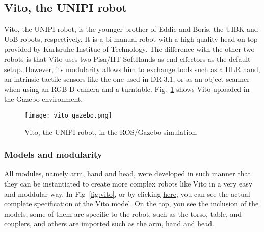 \subsection{Vito, the UNIPI robot}
\label{sec:vito}

Vito, the UNIPI robot, is the younger brother of Eddie and Boris, the UIBK and UoB robots, respectively. It is a bi-manual robot with a high quality head on top provided by Karlsruhe Institue of Technology. The difference with the other two robots is that Vito uses two Pisa/IIT SoftHands as end-effectors as the default setup. However, its modularity allows him to exchange tools such as a DLR hand, an intrinsic tactile sensors like the one used in DR 3.1, or as an object scanner when using an RGB-D camera and a turntable. Fig.~\ref{fig:vito_gazebo} shows Vito uploaded in the Gazebo environment.

\begin{figure}[h]
\centering
\texttt{[image: vito\_gazebo.png]}
\caption{Vito, the UNIPI robot, in the ROS/Gazebo simulation.}
\label{fig:vito_gazebo}
\end{figure}

\subsubsection{Models and modularity}

All modules, namely arm, hand and head, were developed in such manner that they can be instantiated to create more complex robots like Vito in a very easy and moddular way. In Fig~\ref{fig:vito}, or by clicking \href{https://github.com/CentroEPiaggio/vito_robot/blob/master/vito_description/robot/vito.urdf.xacro}{here}, you can see the actual complete specification of the Vito model. On the top, you see the inclusion of the models, some of them are specific to the robot, such as the torso, table, and couplers, and others are imported such as the arm, hand and head.

